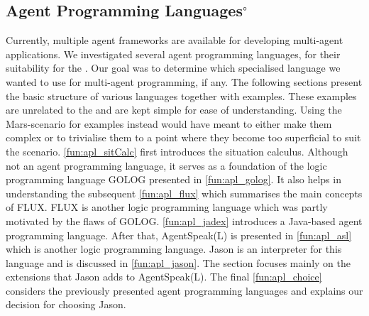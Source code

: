 \subsection[Agent Programming Languages]{Agent Programming Languages$^\circ$}\label{fun:apl}
Currently, multiple agent frameworks are available for developing multi-agent applications.
We investigated several agent programming languages, for their suitability for the \mars{}.
Our goal was to determine which specialised language we wanted to use for multi-agent programming, if any.
The following sections present the basic structure of various languages together with examples.
These examples are unrelated to the \mars{} and are kept simple for ease of understanding.
Using the Mars-scenario for examples instead would have meant to either make them complex or to trivialise them to a point where they become too superficial to suit the scenario.
\autoref{fun:apl_sitCalc} first introduces the situation calculus.
Although not an agent programming language, it serves as a foundation of the logic programming language GOLOG presented in \autoref{fun:apl_golog}.
It also helps in understanding the subsequent \autoref{fun:apl_flux} which summarises the main concepts of FLUX.
FLUX is another logic programming language which was partly motivated by the flaws of GOLOG.
\autoref{fun:apl_jadex} introduces a Java-based agent programming language.
After that, AgentSpeak(L) is presented in \autoref{fun:apl_asl} which is another logic programming language.
Jason is an interpreter for this language and is discussed in \autoref{fun:apl_jason}.
The section focuses mainly on the extensions that Jason adds to AgentSpeak(L).
The final \autoref{fun:apl_choice} considers the previously presented agent programming languages and explains our decision for choosing Jason.














